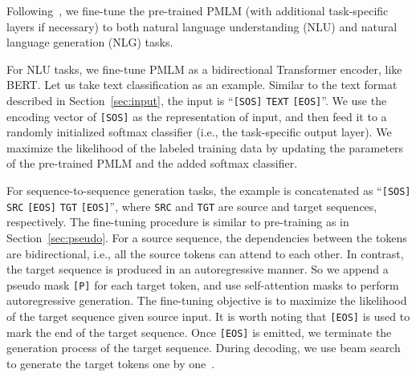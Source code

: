 \documentclass{article}
\newcommand\pmlm{\textsc{PMLM}}
\newcommand{\sptk}[1]{\texttt{[#1]}}
\begin{document}
Following~\cite{unilm}, we fine-tune the pre-trained \pmlm{} (with additional task-specific layers if necessary) to both natural language understanding (NLU) and natural language generation (NLG) tasks.

For NLU tasks, we fine-tune \pmlm{} as a bidirectional Transformer encoder, like BERT.
Let us take text classification as an example.
Similar to the text format described in Section~\ref{sec:input}, the input is ``\sptk{SOS} \texttt{TEXT} \sptk{EOS}''.
We use the encoding vector of \sptk{SOS} as the representation of input, and then feed it to a randomly initialized softmax classifier (i.e., the task-specific output layer).
We maximize the likelihood of the labeled training data by updating the parameters of the pre-trained \pmlm{} and the added softmax classifier.

For sequence-to-sequence generation tasks, the example is concatenated as ``\sptk{SOS} \texttt{SRC} \sptk{EOS} \texttt{TGT} \sptk{EOS}'', where \texttt{SRC} and \texttt{TGT} are source and target sequences, respectively.
The fine-tuning procedure is similar to pre-training as in Section~\ref{sec:pseudo}.
For a source sequence, the dependencies between the tokens are bidirectional, i.e., all the source tokens can attend to each other.
In contrast, the target sequence is produced in an autoregressive manner.
So we append a pseudo mask \sptk{P} for each target token, and use self-attention masks to perform autoregressive generation.
The fine-tuning objective is to maximize the likelihood of the target sequence given source input.
It is worth noting that \sptk{EOS} is used to mark the end of the target sequence.
Once \sptk{EOS} is emitted, we terminate the generation process of the target sequence.
During decoding, we use beam search to generate the target tokens one by one~\cite{unilm}.
\end{document}
